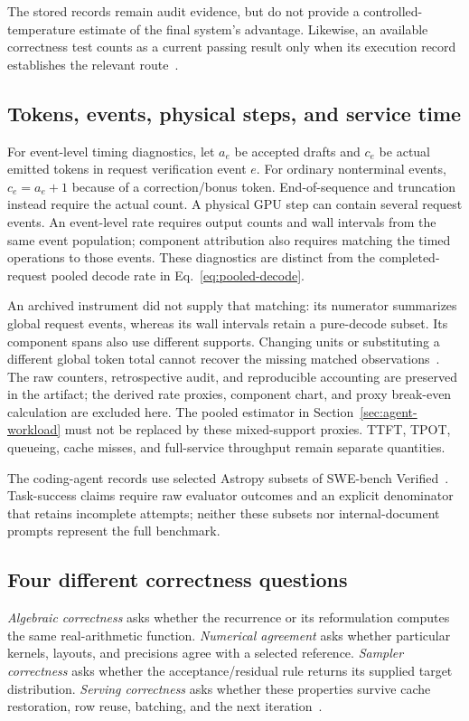 \documentclass[conference]{IEEEtran}
\begin{document}
The stored records remain audit evidence, but do not provide a controlled-temperature estimate of the final system's advantage. Likewise, an available correctness test counts as a current passing result only when its execution record establishes the relevant route~\cite{lumo2026archive}.

\subsection{Tokens, events, physical steps, and service time}
For event-level timing diagnostics, let $a_e$ be accepted drafts and $c_e$ be actual emitted tokens in request verification event $e$. For ordinary nonterminal events, $c_e=a_e+1$ because of a correction/bonus token. End-of-sequence and truncation instead require the actual count. A physical GPU step can contain several request events. An event-level rate requires output counts and wall intervals from the same event population; component attribution also requires matching the timed operations to those events. These diagnostics are distinct from the completed-request pooled decode rate in Eq.~\ref{eq:pooled-decode}.

An archived instrument did not supply that matching: its numerator summarizes global request events, whereas its wall intervals retain a pure-decode subset. Its component spans also use different supports. Changing units or substituting a different global token total cannot recover the missing matched observations~\cite{lumo2026archive}. The raw counters, retrospective audit, and reproducible accounting are preserved in the artifact; the derived rate proxies, component chart, and proxy break-even calculation are excluded here. The pooled estimator in Section~\ref{sec:agent-workload} must not be replaced by these mixed-support proxies. TTFT, TPOT, queueing, cache misses, and full-service throughput remain separate quantities.


The coding-agent records use selected Astropy subsets of SWE-bench Verified~\cite{jimenez2024swe}. Task-success claims require raw evaluator outcomes and an explicit denominator that retains incomplete attempts; neither these subsets nor internal-document prompts represent the full benchmark.

\subsection{Four different correctness questions}
\textit{Algebraic correctness} asks whether the recurrence or its reformulation computes the same real-arithmetic function. \textit{Numerical agreement} asks whether particular kernels, layouts, and precisions agree with a selected reference. \textit{Sampler correctness} asks whether the acceptance/residual rule returns its supplied target distribution. \textit{Serving correctness} asks whether these properties survive cache restoration, row reuse, batching, and the next iteration~\cite{yang2024delta,chen2023sampling,lumo2026archive}.
\end{document}
